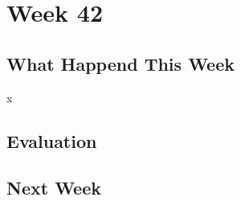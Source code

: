 \section*{Week 42}
\subsection*{What Happend This Week}
x

\subsection*{Evaluation}


\subsection*{Next Week}





